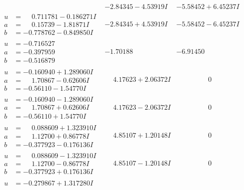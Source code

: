 \documentclass[1p]{elsarticle_modified}
\theoremstyle{definition}
\begin{document}
$$\begin{array}{c|c|c}
 & -2.84345 - 4.53919 I & -5.58452 + 6.45237 I \\ \hline\begin{aligned}
u &= \phantom{-}0.711781 - 0.186271 I \\
a &= \phantom{-}0.15739 - 1.81871 I \\
b &= -0.778762 - 0.849850 I\end{aligned}
 & -2.84345 + 4.53919 I & -5.58452 - 6.45237 I \\ \hline\begin{aligned}
u &= -0.716527\phantom{ +0.000000I} \\
a &= -0.397959\phantom{ +0.000000I} \\
b &= -0.516879\phantom{ +0.000000I}\end{aligned}
 & -1.70188\phantom{ +0.000000I} & -6.91450\phantom{ +0.000000I} \\ \hline\begin{aligned}
u &= -0.160940 + 1.289060 I \\
a &= \phantom{-}1.70867 - 0.62606 I \\
b &= -0.56110 - 1.54770 I\end{aligned}
 & \phantom{-}4.17623 + 2.06372 I & \phantom{-0.000000 } 0 \\ \hline\begin{aligned}
u &= -0.160940 - 1.289060 I \\
a &= \phantom{-}1.70867 + 0.62606 I \\
b &= -0.56110 + 1.54770 I\end{aligned}
 & \phantom{-}4.17623 - 2.06372 I & \phantom{-0.000000 } 0 \\ \hline\begin{aligned}
u &= \phantom{-}0.088609 + 1.323910 I \\
a &= \phantom{-}1.12700 + 0.86778 I \\
b &= -0.377923 - 0.176136 I\end{aligned}
 & \phantom{-}4.85107 + 1.20148 I & \phantom{-0.000000 } 0 \\ \hline\begin{aligned}
u &= \phantom{-}0.088609 - 1.323910 I \\
a &= \phantom{-}1.12700 - 0.86778 I \\
b &= -0.377923 + 0.176136 I\end{aligned}
 & \phantom{-}4.85107 - 1.20148 I & \phantom{-0.000000 } 0 \\ \hline\begin{aligned}
u &= -0.279867 + 1.317280 I \\

\end{aligned}
\end{array}$$
\end{document}
